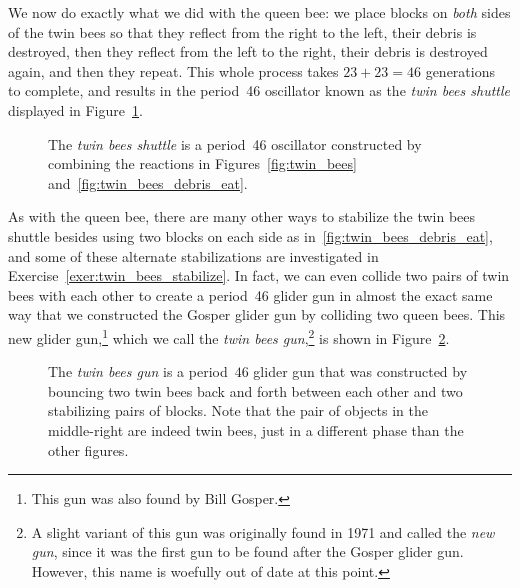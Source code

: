 We now do exactly what we did with the queen bee: we place blocks on \emph{both} sides of the twin bees so that they reflect from the right to the left, their debris is destroyed, then they reflect from the left to the right, their debris is destroyed again, and then they repeat. This whole process takes $23 + 23 = 46$ generations to complete, and results in the period~46 oscillator known as the \emph{twin bees shuttle} displayed in Figure~\ref{fig:twin_bees_shuttle}.

\begin{figure}[!htb]
	\centering{}
	\caption{The \emph{twin bees shuttle} is a period~46 oscillator constructed by combining the reactions in Figures~\ref{fig:twin_bees} and~\ref{fig:twin_bees_debris_eat}.}\label{fig:twin_bees_shuttle}
\end{figure}

As with the queen bee, there are many other ways to stabilize the twin bees shuttle besides using two blocks on each side as in~\ref{fig:twin_bees_debris_eat}, and some of these alternate stabilizations are investigated in Exercise~\ref{exer:twin_bees_stabilize}. In fact, we can even collide two pairs of twin bees with each other to create a period~46 glider gun in almost the exact same way that we constructed the Gosper glider gun by colliding two queen bees. This new glider gun,\footnote{This gun was also found by Bill Gosper.} which we call the \emph{twin bees gun},\footnote{A slight variant of this gun was originally found in 1971 and called the \emph{new gun}, since it was the first gun to be found after the Gosper glider gun. However, this name is woefully out of date at this point.} is shown in Figure~\ref{fig:twin_bees_gun}.

\begin{figure}[!htb]
	\centering{}
	\caption{The \emph{twin bees gun} is a period~$46$ glider gun that was constructed by bouncing two twin bees back and forth between each other and two stabilizing pairs of blocks. Note that the pair of objects in the middle-right are indeed twin bees, just in a different phase than the other figures.}\label{fig:twin_bees_gun}
\end{figure}


